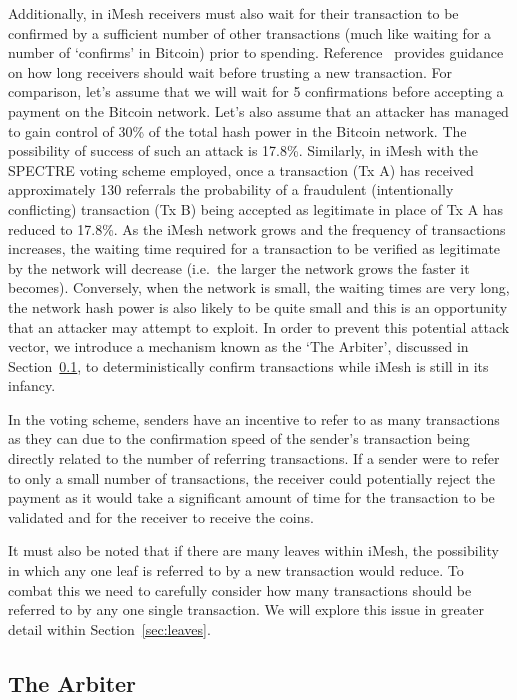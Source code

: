 \documentclass[a4paper,10pt,twocolumn]{article}
\begin{document}
 Additionally, in iMesh receivers must also wait for their transaction to be confirmed by a sufficient number of other transactions 
 (much like waiting for a number of `confirms' in Bitcoin) prior to spending. Reference~\cite{spectre} provides guidance on how long receivers 
 should wait before trusting a new transaction. For comparison, let's assume that we will wait for 5 confirmations before accepting a 
 payment on the Bitcoin network. Let's also assume that an attacker has managed to gain control of 30\% of the total hash power in the 
 Bitcoin network. The possibility of success of such an attack is 17.8\%\cite{btc}. Similarly, in iMesh with the SPECTRE voting scheme 
 employed, once a transaction (Tx A) has received approximately 130 referrals the probability of a fraudulent (intentionally conflicting) 
 transaction (Tx B) being accepted as legitimate in place of Tx A has reduced to 17.8\%. As the iMesh network grows and the frequency of 
 transactions increases, the waiting time required for a transaction to be verified as legitimate by the network will decrease (i.e.\ the 
 larger the network grows the faster it becomes). Conversely, when the network is small, the waiting times are very long, the 
 network hash power is also likely to be quite small and this is an opportunity that an attacker may attempt to exploit. 
In order to prevent this potential attack vector, we introduce a mechanism known as the `The Arbiter', discussed in Section~\ref{sec:arbiter}, to deterministically confirm transactions while iMesh is still in its infancy.

In the voting scheme, senders have an incentive to refer to as many transactions as they can due to the confirmation speed of the 
sender's transaction being directly related to the number of referring transactions. If a sender were to refer to only a small number of 
transactions, the receiver could potentially reject the payment as it would take a significant amount of time for the transaction to be 
validated and for the receiver to receive the coins.

It must also be noted that if there are many leaves within iMesh, the possibility in which any one leaf is referred to by a new 
transaction would reduce. To combat this we need to carefully consider how many transactions should be referred to by any one single 
transaction. We will explore this issue in greater detail within Section~\ref{sec:leaves}.

\subsection{The Arbiter}
\label{sec:arbiter}
\end{document}
